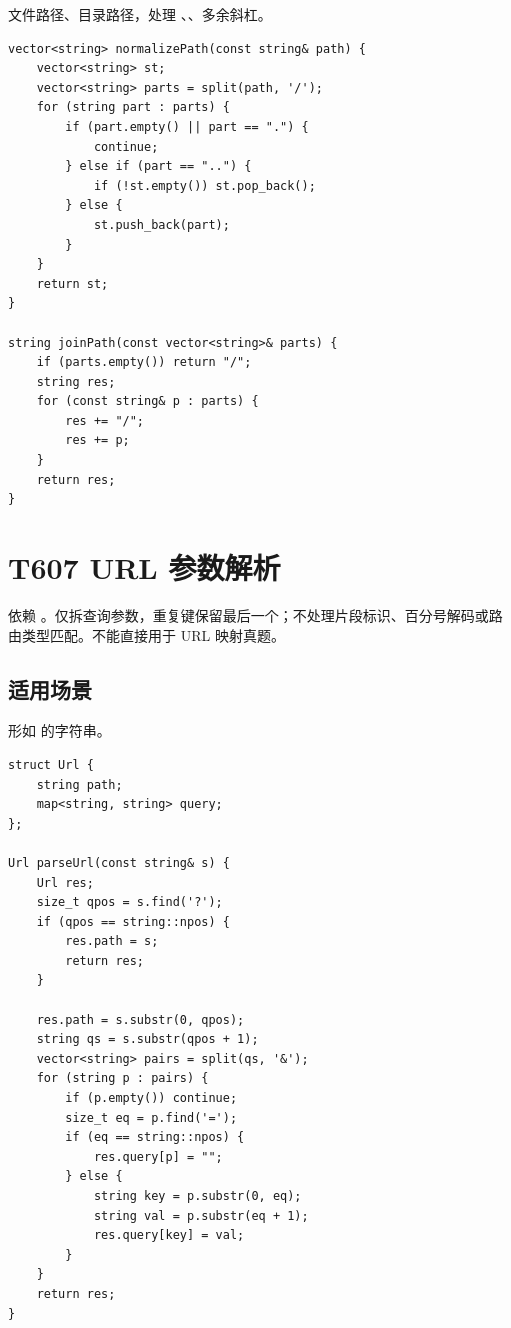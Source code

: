 文件路径、目录路径，处理 、、多余斜杠。

\begin{lstlisting}
vector<string> normalizePath(const string& path) {
    vector<string> st;
    vector<string> parts = split(path, '/');
    for (string part : parts) {
        if (part.empty() || part == ".") {
            continue;
        } else if (part == "..") {
            if (!st.empty()) st.pop_back();
        } else {
            st.push_back(part);
        }
    }
    return st;
}

string joinPath(const vector<string>& parts) {
    if (parts.empty()) return "/";
    string res;
    for (const string& p : parts) {
        res += "/";
        res += p;
    }
    return res;
}
\end{lstlisting}


\section{T607 URL 参数解析}\label{sec:09-47}\label{tpl:607}

依赖 。仅拆查询参数，重复键保留最后一个；不处理片段标识、百分号解码或路由类型匹配。不能直接用于 URL 映射真题。

\subsection{适用场景}

形如  的字符串。

\begin{lstlisting}
struct Url {
    string path;
    map<string, string> query;
};

Url parseUrl(const string& s) {
    Url res;
    size_t qpos = s.find('?');
    if (qpos == string::npos) {
        res.path = s;
        return res;
    }

    res.path = s.substr(0, qpos);
    string qs = s.substr(qpos + 1);
    vector<string> pairs = split(qs, '&');
    for (string p : pairs) {
        if (p.empty()) continue;
        size_t eq = p.find('=');
        if (eq == string::npos) {
            res.query[p] = "";
        } else {
            string key = p.substr(0, eq);
            string val = p.substr(eq + 1);
            res.query[key] = val;
        }
    }
    return res;
}
\end{lstlisting}

